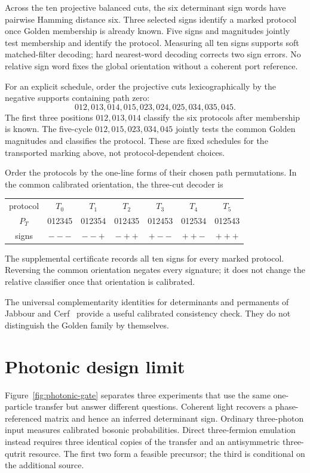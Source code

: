\documentclass[11pt]{article}
\theoremstyle{remark}
\begin{document}
Across the ten projective balanced cuts, the six determinant sign words have
pairwise Hamming distance six.  Three selected signs identify a marked
protocol once Golden membership is already known.  Five signs and magnitudes
jointly test membership and identify the protocol.  Measuring all ten signs
supports soft matched-filter decoding; hard nearest-word decoding corrects
two sign errors.  No relative sign word fixes the global orientation without
a coherent port reference.

For an explicit schedule, order the projective cuts lexicographically by the
negative supports containing path zero:
\[
012,013,014,015,023,024,025,034,035,045.
\]
The first three positions \(012,013,014\) classify the six protocols after
membership is known.  The five-cycle
\(012,015,023,034,045\) jointly tests the common Golden magnitudes and
classifies the protocol.  These are fixed schedules for the transported
marking above, not protocol-dependent choices.

Order the protocols by the one-line forms of their chosen path permutations.
In the common calibrated orientation, the three-cut decoder is
\begin{center}
\small
\begin{tabular}{c@{\quad}cccccc}
\toprule
protocol & \(T_0\)&\(T_1\)&\(T_2\)&\(T_3\)&\(T_4\)&\(T_5\)\\
\(P_T\) &012345&012354&012435&012453&012534&012543\\
signs &\(-{-}-\)&\(-{-}+\)&\(-{+}+\)&\(+{-}-\)&\(+{+}-\)&\(+{+}+\)\\
\bottomrule
\end{tabular}
\end{center}
The supplemental certificate records all ten signs for every marked protocol.
Reversing the common orientation negates every signature; it does not change
the relative classifier once that orientation is calibrated.

The universal complementarity identities for determinants and permanents of
Jabbour and Cerf~\cite{JabbourCerf} provide a useful calibrated consistency
check.  They do not distinguish the Golden family by themselves.

\section{Photonic design limit}

Figure~\ref{fig:photonic-gate} separates three experiments that use the same
one-particle transfer but answer different questions.  Coherent light recovers
a phase-referenced matrix and hence an inferred determinant sign.  Ordinary
three-photon input measures calibrated bosonic probabilities.  Direct
three-fermion emulation instead requires three identical copies of the
transfer and an antisymmetric three-qutrit resource.  The first two form a
feasible precursor; the third is conditional on the additional source.
\end{document}
